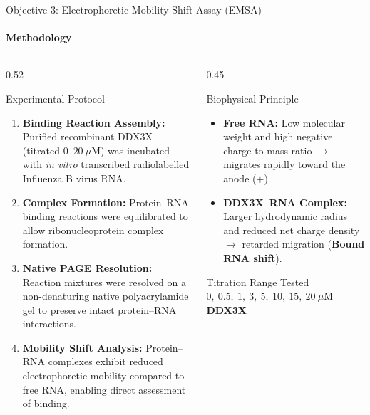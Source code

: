 \documentclass[aspectratio=169, 10pt]{beamer}
\begin{document}
\begin{frame}{Objective 3: Electrophoretic Mobility Shift Assay (EMSA)}
  \framesubtitle{Methodology}
  \begin{columns}[T]
    \begin{column}{0.52\textwidth}
      \begin{block}{Experimental Protocol}
        \footnotesize
        \begin{enumerate}
          \setlength\itemsep{0.4em}
          \item \textbf{Binding Reaction Assembly:} Purified recombinant DDX3X (titrated $0\text{--}20\ \mu\text{M}$) was incubated with \textit{in vitro} transcribed radiolabelled Influenza B virus RNA.
          \item \textbf{Complex Formation:} Protein--RNA binding reactions were equilibrated to allow ribonucleoprotein complex formation.
          \item \textbf{Native PAGE Resolution:} Reaction mixtures were resolved on a non-denaturing native polyacrylamide gel to preserve intact protein--RNA interactions.
          \item \textbf{Mobility Shift Analysis:} Protein--RNA complexes exhibit reduced electrophoretic mobility compared to free RNA, enabling direct assessment of binding.
        \end{enumerate}
      \end{block}
    \end{column}

    \begin{column}{0.45\textwidth}
      \begin{exampleblock}{Biophysical Principle}
        \footnotesize
        \begin{itemize}
          \item \textbf{Free RNA:} Low molecular weight and high negative charge-to-mass ratio $\rightarrow$ migrates rapidly toward the anode ($+$).
          \item \textbf{DDX3X--RNA Complex:} Larger hydrodynamic radius and reduced net charge density $\rightarrow$ retarded migration (\textbf{Bound RNA shift}).
        \end{itemize}
      \end{exampleblock}
      \vspace{0.2cm}
      \begin{alertblock}{Titration Range Tested}
        \centering\small\bfseries $0,\ 0.5,\ 1,\ 3,\ 5,\ 10,\ 15,\ 20\ \mu\text{M}$ DDX3X
      \end{alertblock}
    \end{column}
  \end{columns}
\end{frame}
\end{document}
